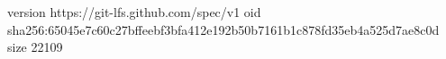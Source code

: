 version https://git-lfs.github.com/spec/v1
oid sha256:65045e7c60c27bffeebf3bfa412e192b50b7161b1c878fd35eb4a525d7ae8c0d
size 22109
